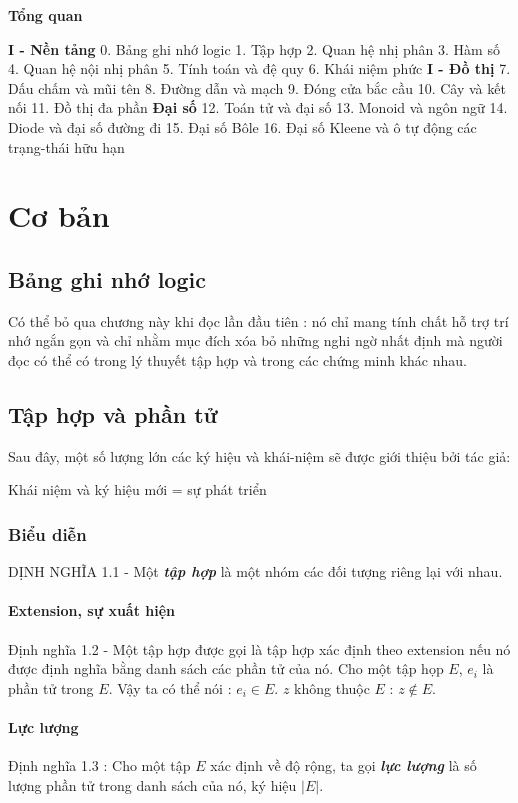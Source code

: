 \documentclass[11pt,a4paper]{report}
\begin{document}
	\begin{center}
		\textbf{Tổng quan}
	\end{center}
\textbf{I - Nền tảng}
0. Bảng ghi nhớ logic
1. Tập hợp
2. Quan hệ nhị phân
3. Hàm số
4. Quan hệ nội nhị phân
5. Tính toán và đệ quy
6. Khái niệm phức
\textbf{I - Đồ thị}
7. Dấu chấm và mũi tên
8. Đường dẫn và mạch
9. Đóng cửa bắc cầu
10. Cây và kết nối
11. Đồ thị đa phần
\textbf{Đại số}
12. Toán tử và đại số
13. Monoid và ngôn ngữ
14. Diode và đại số đường đi
15. Đại số Bôle
16. Đại số Kleene và ô tự động các trạng-thái hữu hạn
\part{Cơ bản}
\chapter{Bảng ghi nhớ logic}
Có thể bỏ qua chương này khi đọc lần đầu tiên : nó chỉ mang tính chất hỗ trợ trí nhớ ngắn gọn và chỉ nhằm mục đích xóa bỏ những nghi ngờ nhất định mà người đọc có thể có trong lý thuyết tập hợp và trong các chứng minh khác nhau.
\chapter{Tập hợp và phần tử}
Sau đây, một số lượng lớn các ký hiệu và khái-niệm sẽ được giới thiệu bởi tác giả:
\begin{center}
Khái niệm và ký hiệu mới = sự phát triển
\end{center}
\section{Biểu diễn}
DỊNH NGHĨA 1.1 - Một \textbf{\textit{tập hợp}} là một nhóm các đối tượng riêng lại với nhau.
\subsection{Extension, sự xuất hiện}
Định nghĩa 1.2 - Một tập hợp được gọi là tập hợp xác định theo extension nếu nó được định nghĩa bằng danh sách các phần tử của nó. 
Cho một tập họp $E$, $e_i$ là phần tử trong $E$. Vậy ta có thể nói : $e_i \in E$.
$z$ không thuộc $E$ : $z \notin E$.
\subsection{Lực lượng}
Định nghĩa 1.3 : Cho một tập $E$ xác định về độ rộng, ta gọi \textbf{\textit{lực lượng}} là số lượng phần tử trong danh sách của nó, ký hiệu $|E|$.
\end{document}
